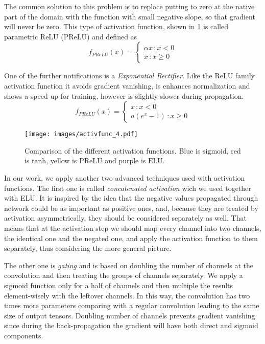 The common solution to this problem is to replace putting to zero at the native part of the domain with the function with small negative slope, so that gradient will never be zero. 
This type of activation function, shown in \ref{fig:act_func} is called parametric ReLU (PReLU) and defined as  
\[ f_{PReLU}(x) = 
\begin{cases}
	\alpha x \, :x<0 \\
	x \, : x \geq 0
\end{cases}
\]

One of the further notifications is a \emph{Exponential Rectifier}.
Like the ReLU family activation function it avoids gradient vanishing, is enhances normalization and shows a speed up for training\cite{bibl:elu}, however is slightly slower during propagation. 
\[ f_{PReLU}(x) = 
\begin{cases}
x \, :x<0 \\
a(e^{x}-1) \, : x \geq 0
\end{cases}
\]

\begin{figure}[]
	\centering
	\texttt{[image: images/activfunc\_4.pdf]}
	\caption{Comparison of the different activation functions. Blue is $\mathrm{sigmoid}$, red is $\mathrm{tanh}$, yellow is $\mathrm{PReLU}$ and purple is $\mathrm{ELU}$.}
	\label{fig:act_func}
\end{figure}


In our work, we apply another two advanced techniques used with activation functions.
The first one is called \emph{concatenated activation} wich we used together with ELU.
It is inspired by the idea that the negative values propagated through network could be as important as positive ones, and, because they are treated by activation asymmetrically, they should be considered separately as well\cite{bibl:concat_rectif}.
That means that at the activation step we should map every channel into two channels, the identical one and the negated one, and apply the activation function to them separately, thus considering the more general picture.
\medskip

The other one is \emph{gating} and is based on doubling the number of channels at the convolution and then treating the groups of channels separately.
We apply a sigmoid function only for a half of channels and then multiple the results element-wisely with the leftover channels.
In this way, the convolution has two times more parameters comparing with a regular convolution leading to the same size of output tensors.
Doubling number of channels prevents gradient vanishing since during the back-propagation the gradient will have both direct and sigmoid components\cite{bibl:conv_gating}. 

